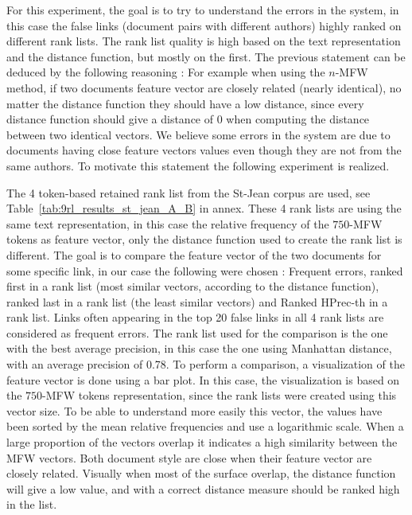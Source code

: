 For this experiment, the goal is to try to understand the errors in the system, in this case the false links (document pairs with different authors) highly ranked on different rank lists.
The rank list quality is high based on the text representation and the distance function, but mostly on the first.
The previous statement can be deduced by the following reasoning : For example when using the $n$-MFW method, if two documents feature vector are closely related (nearly identical), no matter the distance function they should have a low distance, since every distance function should give a distance of 0 when computing the distance between two identical vectors.
We believe some errors in the system are due to documents having close feature vectors values even though they are not from the same authors.
To motivate this statement the following experiment is realized.

The 4 token-based retained rank list from the St-Jean corpus are used, see Table~\ref{tab:9rl_results_st_jean_A_B} in annex.
These 4 rank lists are using the same text representation, in this case the relative frequency of the $750$-MFW tokens as feature vector, only the distance function used to create the rank list is different.
The goal is to compare the feature vector of the two documents for some specific link, in our case the following were chosen : Frequent errors, ranked first in a rank list (most similar vectors, according to the distance function), ranked last in a rank list (the least similar vectors) and Ranked HPrec-th in a rank list.
Links often appearing in the top 20 false links in all 4 rank lists are considered as frequent errors.
The rank list used for the comparison is the one with the best average precision, in this case the one using Manhattan distance, with an average precision of 0.78.
To perform a comparison, a visualization of the feature vector is done using a bar plot.
In this case, the visualization is based on the $750$-MFW tokens representation, since the rank lists were created using this vector size.
To be able to understand more easily this vector, the values have been sorted by the mean relative frequencies and use a logarithmic scale.
When a large proportion of the vectors overlap it indicates a high similarity between the MFW vectors.
Both document style are close when their feature vector are closely related.
Visually when most of the surface overlap, the distance function will give a low value, and with a correct distance measure should be ranked high in the list.

